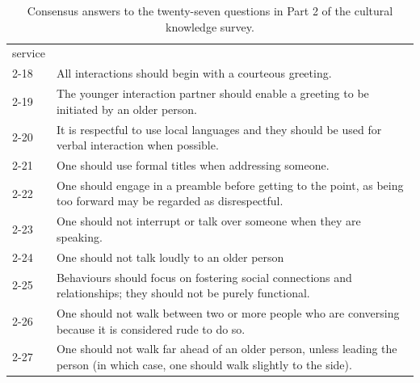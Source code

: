 \documentclass{CSSRforAfrica}
\begin{document}
\begin{table}[H]
\begin{center}
\begin{tabularx}{\linewidth}{|l |X|}
{service}\\
{\small 2-18 }  & {\small All interactions should begin with a courteous greeting.}\\
{\small 2-19 }  & {\small The younger interaction partner should enable a greeting to be initiated by an older person.}\\
{\small 2-20 }  & {\small It is respectful to use local languages and they should be used for verbal interaction when possible.}\\
{\small 2-21 }  & {\small One should use formal titles when addressing someone.}\\
{\small 2-22 }  & {\small One should engage in a preamble before getting to the point, as being too forward may be regarded as disrespectful.}\\
{\small 2-23 }  & {\small One should not interrupt or talk over someone when they are speaking.}\\
{\small 2-24 }  & {\small One should not talk loudly to an older person}\\
{\small 2-25 }  & {\small Behaviours should focus on fostering social connections and relationships; they should not be
purely functional.}\\
{\small 2-26 } & {\small One should not walk between two or more people who are conversing because it is considered
rude to do so.}\\
{\small 2-27 }  & {\small One should not walk far ahead of an older person, unless leading the person (in which case, one
should walk slightly to the side).}\\
\hline \hline
\end{tabularx}
\end{center}
\vspace{-5mm}
\caption{ Consensus answers to the  twenty-seven questions in Part 2 of the cultural knowledge survey. }
\label{table:AllAnswers2}
\end{table}
 
\end{document}
